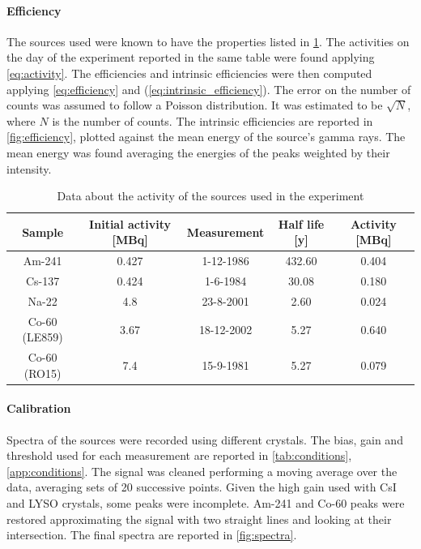 \documentclass[a4paper, 11pt, table]{article}
\begin{document}
\paragraph{Efficiency}
The sources used were known to have the properties listed in \cref{tab:sources}. The activities on the day of the experiment reported in the same table were found applying \cref{eq:activity}. The efficiencies and intrinsic efficiencies were then computed applying \cref{eq:efficiency} and (\ref{eq:intrinsic_efficiency}). The error on the number of counts was assumed to follow a Poisson distribution. It was estimated to be $\sqrt{N}$, where $N$ is the number of counts. The intrinsic efficiencies are reported in \cref{fig:efficiency}, plotted against the mean energy of the source's gamma rays. The mean energy was found averaging the energies of the peaks weighted by their intensity.

\begin{table}
    \caption{Data about the activity of the sources used in the experiment}
    \label{tab:sources}
    \begin{tabular}{ccccc}
        \toprule
        Sample        & Initial activity [MBq] & Measurement & Half life [y] & Activity [MBq] \\
        \midrule
        Am-241        & 0.427                  & 1-12-1986   & 432.60        & 0.404          \\
        Cs-137        & 0.424                  & 1-6-1984    & 30.08         & 0.180          \\
        Na-22         & 4.8                    & 23-8-2001   & 2.60          & 0.024          \\
        Co-60 (LE859) & 3.67                   & 18-12-2002  & 5.27          & 0.640          \\
        Co-60 (RO15)  & 7.4                    & 15-9-1981   & 5.27          & 0.079          \\
        \bottomrule
    \end{tabular}
\end{table}

\paragraph{Calibration}
Spectra of the sources were recorded using different crystals. The bias, gain and threshold used for each measurement are reported in \cref{tab:conditions}, \cref{app:conditions}. The signal was cleaned performing a moving average over the data, averaging sets of 20 successive points. Given the high gain used with CsI and LYSO crystals, some peaks were incomplete. Am-241 and Co-60 peaks were restored approximating the signal with two straight lines and looking at their intersection. The final spectra are reported in \cref{fig:spectra}.\\
\end{document}
